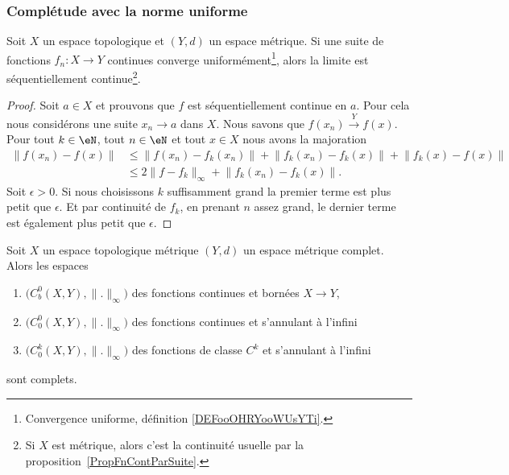\subsubsection{Complétude avec la norme uniforme}

\begin{proposition}\label{PropCZslHBx}
	Soit \( X\) un espace topologique et \( (Y,d)\) un espace métrique. Si une suite de fonctions \( f_n\colon X\to Y\) continues converge uniformément\footnote{Convergence uniforme, définition \ref{DEFooOHRYooWUsYTi}.}, alors la limite est séquentiellement continue\footnote{Si \( X\) est métrique, alors c'est la continuité usuelle par la proposition~\ref{PropFnContParSuite}.}.
\end{proposition}

\begin{proof}
	Soit \( a\in X\) et prouvons que \( f\) est séquentiellement continue en \( a\). Pour cela nous considérons une suite \( x_n\to a\) dans \( X\). Nous savons que \( f(x_n)\stackrel{Y}{\longrightarrow}f(x)\). Pour tout \(k\in \eN\), tout \( n\in \eN\) et tout \( x\in X\) nous avons la majoration
	\begin{subequations}
		\begin{align}
			\big\| f(x_n)-f(x) \big\| & \leq \big\| f(x_n)-f_k(x_n) \big\|+\big\| f_k(x_n)-f_k(x) \big\|+\big\| f_k(x)-f(x) \big\| \\
			                          & \leq 2\| f-f_k \|_{\infty}+\big\| f_k(x_n)-f_k(x) \big\|.
		\end{align}
	\end{subequations}
	Soit \( \epsilon>0\). Si nous choisissons \( k\) suffisamment grand la premier terme est plus petit que \( \epsilon\). Et par continuité de \( f_k\), en prenant \( n\) assez grand, le dernier terme est également plus petit que \( \epsilon\).
\end{proof}

\begin{proposition} \label{PropSYMEZGU}
	Soit \( X\) un espace topologique métrique \( (Y,d)\) un espace métrique complet. Alors les espaces
	\begin{enumerate}
		\item
		      \( \big( C^0_b(X,Y),\| . \|_{\infty} \big)\) des fonctions continues et bornées \( X\to Y\),
		\item
		      \( \big( C^0_0(X,Y),\| . \|_{\infty} \big)\) des fonctions continues et s'annulant à l'infini
		\item
		      \( \big( C^k_0(X,Y),\| . \|_{\infty} \big)\) des fonctions de classe \( C^k\) et s'annulant à l'infini
	\end{enumerate}
	sont complets.
\end{proposition}

